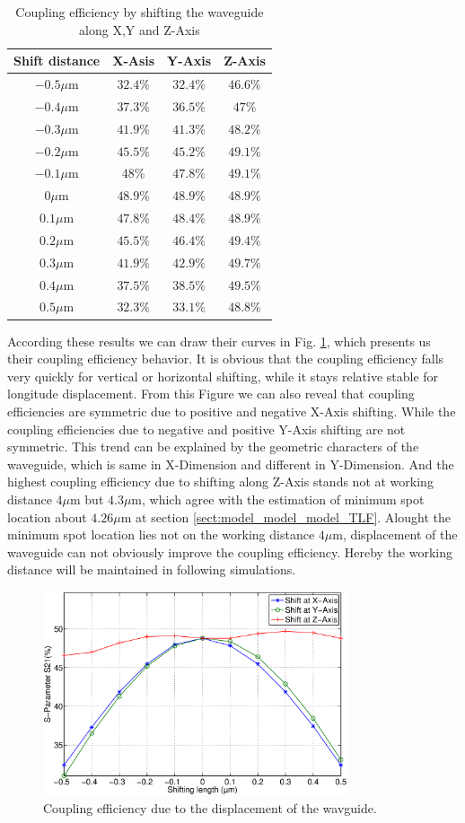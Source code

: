 \begin{table}
\caption{Coupling efficiency by shifting the waveguide along X,Y and Z-Axis}
\centering
\begin{tabular}{c|ccc}
\hline
Shift distance & X-Asis & Y-Axis & Z-Axis \\
\hline
$-0.5\mu$m 		&$32.4\%$	&$32.4\%$&$46.6\%$	\\
$-0.4\mu$m		&$37.3\%$	&$36.5\%$&$47\%$	\\
$-0.3\mu$m 		&$41.9\%$	&$41.3\%$&$48.2\%$	\\
$-0.2\mu$m	  &$45.5\%$	&$45.2\%$&$49.1\%$	\\
$-0.1\mu$m		&$48\%$	&$47.8\%$&$49.1\%$	\\
$0\mu$m			  &$48.9\%$	&$48.9\%$&$48.9\%$	\\
$0.1\mu$m			&$47.8\%$	&$48.4\%$&$48.9\%$	\\
$0.2\mu$m			&$45.5\%$	&$46.4\%$&$49.4\%$	\\
$0.3\mu$m			&$41.9\%$	&$42.9\%$&$49.7\%$	\\
$0.4\mu$m			&$37.5\%$	&$38.5\%$&$49.5\%$	\\
$0.5\mu$m			&$32.3\%$	&$33.1\%$&$48.8\%$	\\
\hline
\end{tabular}
\label{tab:shift_result}
\end{table}
According these results we can draw their curves in Fig. \ref{fig:shift_curve}, which presents us their coupling efficiency behavior. It is obvious that the coupling efficiency falls very quickly for vertical or horizontal shifting, while it stays relative stable for longitude displacement. From this Figure we can also reveal that coupling efficiencies are symmetric due to positive and negative X-Axis shifting. While the coupling efficiencies due to negative and positive Y-Axis shifting are not symmetric. This trend can be explained by the geometric characters of the waveguide, which is same in X-Dimension and different in Y-Dimension. And the highest coupling efficiency due to shifting along Z-Axis stands not at working distance $4\mu$m but $4.3\mu$m, which agree with the estimation of minimum spot location about $4.26\mu$m at section \ref{sect:model_model_model_TLF}. Alought the minimum spot location lies not on the working distance $4\mu$m, displacement of the waveguide can not obviously improve the coupling efficiency. Hereby the working distance will be maintained in following simulations.\\
  
\begin{figure}[!ht]
\centering
\includegraphics[width=0.8\textwidth]{bilder/shift_curve}
\caption{Coupling efficiency due to the displacement of the wavguide.}
\label{fig:shift_curve}
\end{figure}
